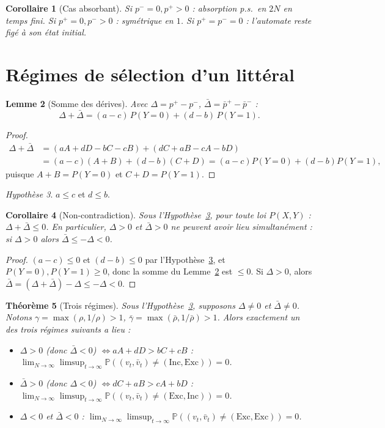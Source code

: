 \documentclass[12pt,a4paper]{article}
\newtheorem{theorem}{Théorème}
\newtheorem{lemma}[theorem]{Lemme}
\newtheorem{corollary}[theorem]{Corollaire}
\theoremstyle{remark}
\newtheorem{hypothese}[theorem]{Hypothèse}
\newcommand{\Inc}{\ensuremath{\mathrm{Inc}}}
\newcommand{\Exc}{\ensuremath{\mathrm{Exc}}}
\newcommand{\vbar}{\bar{v}}
\begin{document}
\begin{corollary}[Cas absorbant]\label{cor:absorb}
Si $p^-=0,p^+>0$ : absorption p.s.\ en $2N$ en temps fini. Si $p^+=0,p^->0$ :
symétrique en $1$. Si $p^+=p^-=0$ : l'automate reste figé à son état initial.
\end{corollary}

\section{Régimes de sélection d'un littéral}

\begin{lemma}[Somme des dérives]\label{lem:sum}
Avec $\Delta=p^+-p^-$, $\bar\Delta=\bar p^+-\bar p^-$ :
\[
  \Delta+\bar\Delta = (a-c)\,P(Y{=}0) + (d-b)\,P(Y{=}1).
\]
\end{lemma}

\begin{proof}
\begin{align*}
\Delta+\bar\Delta &= (aA+dD-bC-cB) + (dC+aB-cA-bD) \\
&= (a-c)(A+B) + (d-b)(C+D) = (a-c)P(Y{=}0)+(d-b)P(Y{=}1),
\end{align*}
puisque $A+B=P(Y{=}0)$ et $C+D=P(Y{=}1)$.
\end{proof}

\begin{hypothese}\label{hyp:H}
$a\le c$ et $d\le b$.
\end{hypothese}

\begin{corollary}[Non-contradiction]\label{cor:excl}
Sous l'Hypothèse~\ref{hyp:H}, pour toute loi $P(X,Y)$ : $\Delta+\bar\Delta\le0$.
En particulier, $\Delta>0$ et $\bar\Delta>0$ ne peuvent avoir lieu
simultanément : si $\Delta>0$ alors $\bar\Delta\le-\Delta<0$.
\end{corollary}

\begin{proof}
$(a-c)\le0$ et $(d-b)\le0$ par l'Hypothèse~\ref{hyp:H}, et
$P(Y{=}0),P(Y{=}1)\ge0$, donc la somme du Lemme~\ref{lem:sum} est $\le0$. Si
$\Delta>0$, alors $\bar\Delta=(\Delta+\bar\Delta)-\Delta\le-\Delta<0$.
\end{proof}

\begin{theorem}[Trois régimes]\label{thm:sel}
Sous l'Hypothèse~\ref{hyp:H}, supposons $\Delta\ne0$ et $\bar\Delta\ne0$.
Notons $\gamma=\max(\rho,1/\rho)>1$, $\bar\gamma=\max(\bar\rho,1/\bar\rho)>1$.
Alors exactement un des trois régimes suivants a lieu :
\begin{itemize}
  \item $\Delta>0$ (donc $\bar\Delta<0$) $\iff aA+dD>bC+cB$ :
  $\lim_{N\to\infty}\limsup_{t\to\infty}\mathbb P((v_t,\vbar_t)\ne(\Inc,\Exc)) = 0$.
  \item $\bar\Delta>0$ (donc $\Delta<0$) $\iff dC+aB>cA+bD$ :
  $\lim_{N\to\infty}\limsup_{t\to\infty}\mathbb P((v_t,\vbar_t)\ne(\Exc,\Inc)) = 0$.
  \item $\Delta<0$ et $\bar\Delta<0$ :
  $\lim_{N\to\infty}\limsup_{t\to\infty}\mathbb P((v_t,\vbar_t)\ne(\Exc,\Exc)) = 0$.
\end{itemize}
\end{theorem}
\end{document}
